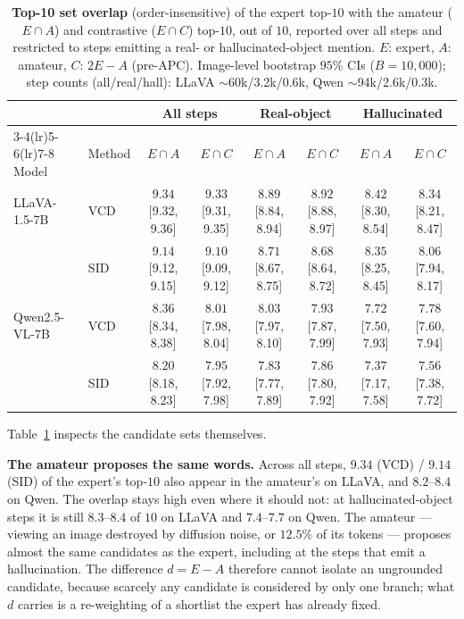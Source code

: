 \documentclass{article}
\begin{document}
\begin{table}[t]
\centering
\small
\setlength{\tabcolsep}{1.5pt}
\caption{\textbf{Top-10 set overlap} (order-insensitive) of the expert top-$10$
with the amateur ($E\!\cap\!A$) and contrastive ($E\!\cap\!C$) top-$10$, out of
$10$, reported over all steps and restricted to steps emitting a real- or
hallucinated-object mention. $E$: expert, $A$: amateur, $C$: $2E-A$ (pre-APC).
Image-level bootstrap $95\%$ CIs ($B=10{,}000$); step counts (all/real/hall):
LLaVA $\sim$60k/3.2k/0.6k, Qwen $\sim$94k/2.6k/0.3k.}
\label{tab:cdmech-overlap}
\begin{tabular}{llcccccc}
\toprule
& & \multicolumn{2}{c}{All steps} & \multicolumn{2}{c}{Real-object} & \multicolumn{2}{c}{Hallucinated} \\
\cmidrule(lr){3-4}\cmidrule(lr){5-6}\cmidrule(lr){7-8}
Model & Method & $E\!\cap\!A$ & $E\!\cap\!C$ & $E\!\cap\!A$ & $E\!\cap\!C$ & $E\!\cap\!A$ & $E\!\cap\!C$ \\
\midrule
LLaVA-1.5-7B
 & VCD & $9.34$ \tiny{[9.32, 9.36]} & $9.33$ \tiny{[9.31, 9.35]} & $8.89$ \tiny{[8.84, 8.94]} & $8.92$ \tiny{[8.88, 8.97]} & $8.42$ \tiny{[8.30, 8.54]} & $8.34$ \tiny{[8.21, 8.47]} \\
 & SID & $9.14$ \tiny{[9.12, 9.15]} & $9.10$ \tiny{[9.09, 9.12]} & $8.71$ \tiny{[8.67, 8.75]} & $8.68$ \tiny{[8.64, 8.72]} & $8.35$ \tiny{[8.25, 8.45]} & $8.06$ \tiny{[7.94, 8.17]} \\
\midrule
Qwen2.5-VL-7B
 & VCD & $8.36$ \tiny{[8.34, 8.38]} & $8.01$ \tiny{[7.98, 8.04]} & $8.03$ \tiny{[7.97, 8.10]} & $7.93$ \tiny{[7.87, 7.99]} & $7.72$ \tiny{[7.50, 7.93]} & $7.78$ \tiny{[7.60, 7.94]} \\
 & SID & $8.20$ \tiny{[8.18, 8.23]} & $7.95$ \tiny{[7.92, 7.98]} & $7.83$ \tiny{[7.77, 7.89]} & $7.86$ \tiny{[7.80, 7.92]} & $7.37$ \tiny{[7.17, 7.58]} & $7.56$ \tiny{[7.38, 7.72]} \\
\bottomrule
\end{tabular}
\end{table}

Table~\ref{tab:cdmech-overlap} inspects the candidate sets themselves.

\textbf{The amateur proposes the same words.} Across all steps, $9.34$ (VCD) /
$9.14$ (SID) of the expert's top-$10$ also appear in the amateur's on LLaVA, and
$8.2$--$8.4$ on Qwen. The overlap stays high even where it should not: at
hallucinated-object steps it is still $8.3$--$8.4$ of $10$ on LLaVA and
$7.4$--$7.7$ on Qwen. The amateur --- viewing an image destroyed by diffusion
noise, or $12.5\%$ of its tokens --- proposes almost the same candidates as the
expert, including at the steps that emit a hallucination. The difference
$d = E - A$ therefore cannot isolate an ungrounded candidate, because scarcely
any candidate is considered by only one branch; what $d$ carries is a
re-weighting of a shortlist the expert has already fixed.
\end{document}
